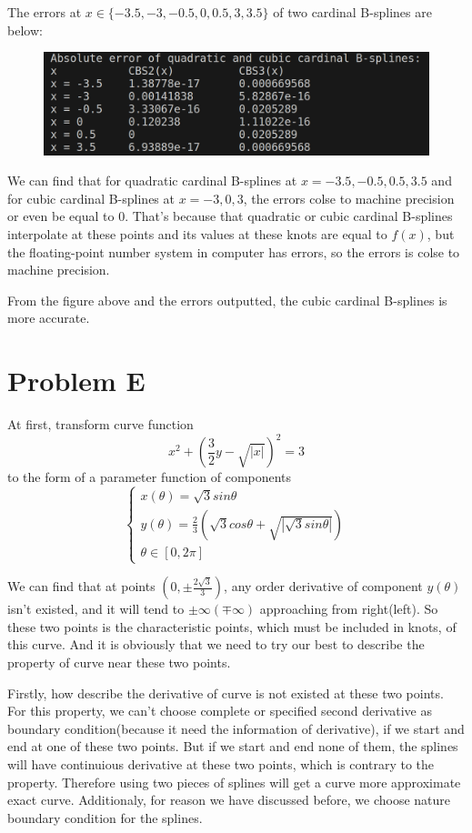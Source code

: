 \documentclass{article}
\begin{document}
The errors at $x\in\{-3.5,-3,-0.5,0,0.5,3,3.5\}$ of two cardinal B-splines are below:
\begin{figure}[h]
    \centering
    \includegraphics[width=0.5\linewidth]{problemBerrors.png}
\end{figure}

We can find that for quadratic cardinal B-splines at $x=-3.5,-0.5,0.5,3.5$ and for cubic cardinal B-splines at $x=-3,0,3$, the errors colse to machine precision or even be equal to $0$. That's because that quadratic or cubic cardinal B-splines interpolate at these points and its values at these knots are equal to $f(x)$, but the floating-point number system in computer has errors, so the errors is colse to machine precision.

From the figure above and the errors outputted, the cubic cardinal B-splines is more accurate.
\section{Problem E}
At first, transform curve function $$x^2+(\frac{3}{2}y-\sqrt{|x|})^2=3$$
to the form of a parameter function of components
$$
\begin{cases}
x(\theta) = \sqrt{3}sin\theta\\
y(\theta) = \frac{2}{3}(\sqrt{3}cos\theta + \sqrt{|\sqrt{3}sin\theta|})\\
\theta \in [0,2\pi]
\end{cases}
$$

We can find that at points $(0, \pm\frac{2\sqrt{3}}{3})$, any order derivative of component $y(\theta)$ isn't existed, and it will tend to $\pm\infty(\mp\infty)$ approaching from right(left). So these two points is the characteristic points, which must be included in knots, of this curve. And it is obviously that we need to try our best to describe the property of curve near these two points.

Firstly, how describe the derivative of curve is not existed at these two points. For this property, we can't choose complete or specified second derivative as boundary condition(because it need the information of derivative), if we start and end at one of these two points. But if we start and end none of them, the splines will have continuious derivative at these two points, which is contrary to the property. Therefore using two pieces of splines will get a curve more approximate exact curve. Additionaly, for reason we have discussed before, we choose nature boundary condition for the splines.
\end{document}
